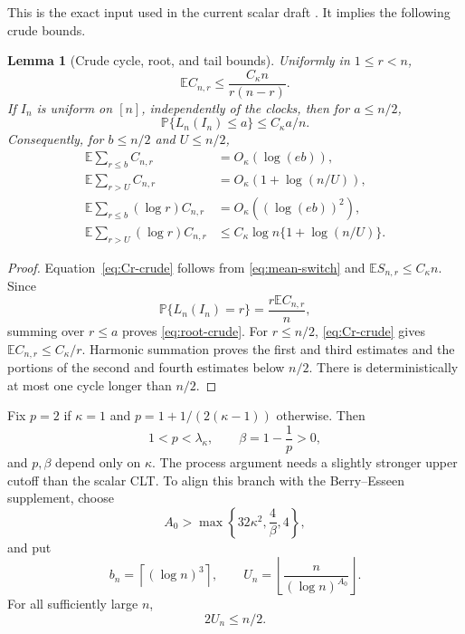 \documentclass[11pt]{article}
\newtheorem{lemma}[theorem]{Lemma}
\theoremstyle{definition}
\theoremstyle{remark}
\newcommand{\Pp}{\mathbb P}
\newcommand{\Ee}{\mathbb E}
\begin{document}
This is the exact input used in the current scalar draft
\cite{LongOrder2026}.  It implies the following crude bounds.

\begin{lemma}[Crude cycle, root, and tail bounds]
\label{lem:crude}
Uniformly in $1\le r<n$,
\begin{equation}\label{eq:Cr-crude}
 \Ee C_{n,r}\le \frac{C_\kappa n}{r(n-r)}.
\end{equation}
If $I_n$ is uniform on $[n]$, independently of the clocks, then for
$a\le n/2$,
\begin{equation}\label{eq:root-crude}
 \Pp\{L_n(I_n)\le a\}\le C_\kappa a/n.
\end{equation}
Consequently, for $b\le n/2$ and $U\le n/2$,
\begin{align}
 \Ee\sum_{r\le b}C_{n,r}&=O_\kappa(\log(eb)),
 \label{eq:small-count-tail}\\
 \Ee\sum_{r>U}C_{n,r}&=O_\kappa(1+\log(n/U)),
 \label{eq:large-count-tail}\\
 \Ee\sum_{r\le b}(\log r)C_{n,r}
 &=O_\kappa((\log(eb))^2),
 \label{eq:small-weight-tail}\\
 \Ee\sum_{r>U}(\log r)C_{n,r}
 &\le C_\kappa\log n\{1+\log(n/U)\}.
 \label{eq:large-weight-tail}
\end{align}
\end{lemma}

\begin{proof}
Equation~\eqref{eq:Cr-crude} follows from
\eqref{eq:mean-switch} and $\Ee S_{n,r}\le C_\kappa n$.  Since
\[
 \Pp\{L_n(I_n)=r\}=\frac{r\Ee C_{n,r}}n,
\]
summing over $r\le a$ proves \eqref{eq:root-crude}.  For $r\le n/2$,
\eqref{eq:Cr-crude} gives $\Ee C_{n,r}\le C_\kappa/r$.  Harmonic summation
proves the first and third estimates and the portions of the second and
fourth estimates below $n/2$.  There is deterministically at most one cycle
longer than $n/2$.
\end{proof}

Fix $p=2$ if $\kappa=1$ and $p=1+1/(2(\kappa-1))$ otherwise. Then
\begin{equation}\label{eq:p-beta}
 1<p<\lambda_\kappa,
 \qquad
 \beta=1-\frac1p>0,
\end{equation}
and $p,\beta$ depend only on $\kappa$.
The process argument needs a slightly stronger upper cutoff than the scalar
CLT.  To align this branch with the Berry--Esseen supplement, choose
\begin{equation}\label{eq:A0-choice}
 A_0>\max\left\{32\kappa^2,\frac4\beta,4\right\},
\end{equation}
and put
\begin{equation}\label{eq:cutoffs}
 b_n=\left\lceil(\log n)^3\right\rceil,
 \qquad
 U_n=\left\lfloor\frac{n}{(\log n)^{A_0}}\right\rfloor.
\end{equation}
For all sufficiently large $n$,
\begin{equation}\label{eq:cutoff-range}
 2U_n\le n/2.
\end{equation}
\end{document}
